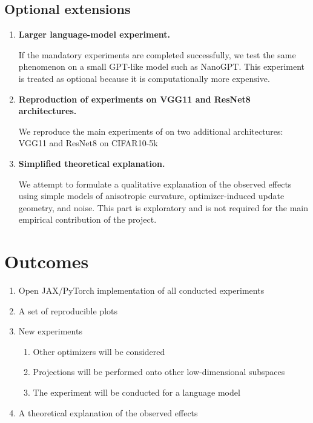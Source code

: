 \documentclass[conference]{IEEEtran}
\begin{document}
\subsection{Optional extensions}
\begin{enumerate}
    \item \textbf{Larger language-model experiment.}
    
    If the mandatory experiments are completed successfully, we test the same phenomenon on a small GPT-like model such as NanoGPT. This experiment is treated as optional because it is computationally more expensive.

    \item \textbf{Reproduction of experiments on VGG11 and ResNet8 architectures.}

    We reproduce the main experiments of \citet{SongDoesSGD} on two additional architectures: VGG11 and ResNet8 on CIFAR10-5k
    
    \item \textbf{Simplified theoretical explanation.}
    
    We attempt to formulate a qualitative explanation of the observed effects using simple models of anisotropic curvature, optimizer-induced update geometry, and noise. This part is exploratory and is not required for the main empirical contribution of the project.
\end{enumerate}

\section{Outcomes}

\begin{enumerate}
    \item Open JAX/PyTorch implementation of all conducted experiments
    \item A set of reproducible plots
    \item New experiments
    \begin{enumerate}
        \item Other optimizers will be considered
        \item Projections will be performed onto other low-dimensional subspaces
        \item The experiment will be conducted for a language model
    \end{enumerate}
    \item A theoretical explanation of the observed effects
\end{enumerate}
\end{document}
